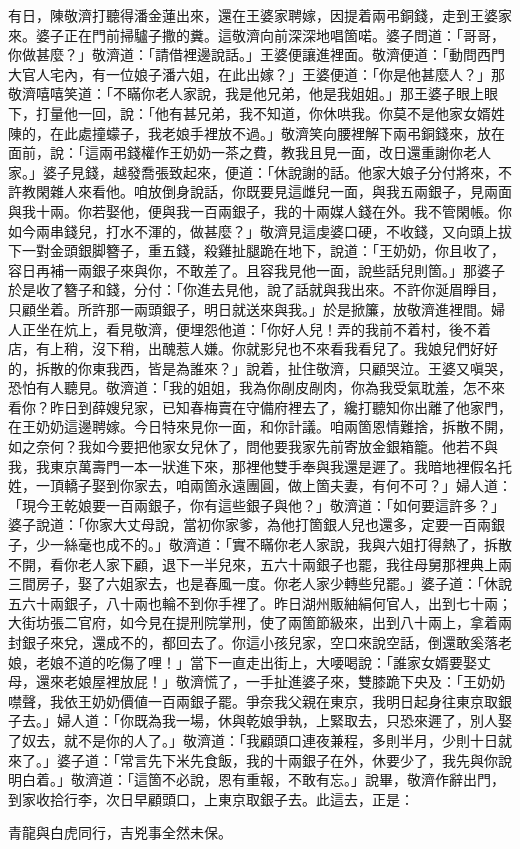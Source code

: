 有日，陳敬濟打聽得潘金蓮出來，還在王婆家聘嫁，因提着兩弔銅錢，走到王婆家來。婆子正在門前掃驢子撒的糞。這敬濟向前深深地唱箇喏。婆子問道：「哥哥，你做甚麼？」敬濟道：「請借裡邊說話。」王婆便讓進裡面。敬濟便道：「動問西門大官人宅內，有一位娘子潘六姐，在此出嫁？」王婆便道：「你是他甚麼人？」那敬濟嘻嘻笑道：「不瞞你老人家說，我是他兄弟，他是我姐姐。」那王婆子眼上眼下，打量他一回，說：「他有甚兄弟，我不知道，你休哄我。你莫不是他家女婿姓陳的，在此處撞蠓子，{}我老娘手裡放不過。」敬濟笑向腰裡解下兩弔銅錢來，放在面前，說：「這兩弔錢權作王奶奶一茶之費，教我且見一面，改日還重謝你老人家。」婆子見錢，越發喬張致起來，便道：「休說謝的話。他家大娘子分付將來，不許教閑雜人來看他。咱放倒身說話，你既要見這雌兒一面，與我五兩銀子，見兩面與我十兩。你若娶他，便與我一百兩銀子，我的十兩媒人錢在外。{}我不管閑帳。你如今兩串錢兒，打水不渾的，做甚麼？」敬濟見這虔婆口硬，不收錢，又向頭上拔下一對金頭銀脚簪子，重五錢，殺雞扯腿跪在地下，說道：「王奶奶，你且收了，容日再補一兩銀子來與你，不敢差了。且容我見他一面，說些話兒則箇。」那婆子於是收了簪子和錢，分付：「你進去見他，說了話就與我出來。不許你涎眉睜目，只顧坐着。{}所許那一兩頭銀子，明日就送來與我。」於是掀簾，放敬濟進裡間。婦人正坐在炕上，看見敬濟，便埋怨他道：「你好人兒！弄的我前不着村，後不着店，有上稍，沒下稍，出醜惹人嫌。你就影兒也不來看我看兒了。我娘兒們好好的，拆散的你東我西，皆是為誰來？」說着，扯住敬濟，只顧哭泣。王婆又嗔哭，恐怕有人聽見。敬濟道：「我的姐姐，我為你剮皮剮肉，你為我受氣耽羞，怎不來看你？昨日到薛嫂兒家，已知春梅賣在守備府裡去了，纔打聽知你出離了他家門，在王奶奶這邊聘嫁。今日特來見你一面，和你計議。咱兩箇恩情難捨，拆散不開，如之奈何？我如今要把他家女兒休了，問他要我家先前寄放金銀箱籠。他若不與我，我東京萬壽門一本一狀進下來，那裡他雙手奉與我還是遲了。我暗地裡假名托姓，一頂轎子娶到你家去，咱兩箇永遠團圓，做上箇夫妻，有何不可？」婦人道：「現今王乾娘要一百兩銀子，你有這些銀子與他？」敬濟道：「如何要這許多？」婆子說道：「你家大丈母說，當初你家爹，為他打箇銀人兒也還多，定要一百兩銀子，少一絲毫也成不的。」敬濟道：「實不瞞你老人家說，我與六姐打得熱了，拆散不開，看你老人家下顧，退下一半兒來，五六十兩銀子也罷，我往母舅那裡典上兩三間房子，娶了六姐家去，也是春風一度。你老人家少轉些兒罷。」婆子道：「休說五六十兩銀子，八十兩也輪不到你手裡了。昨日湖州販紬絹何官人，{}出到七十兩；大街坊張二官府，如今見在提刑院掌刑，使了兩箇節級來，出到八十兩上，拿着兩封銀子來兌，還成不的，都回去了。你這小孩兒家，空口來說空話，倒還敢奚落老娘，老娘不道的吃傷了哩！」當下一直走出街上，大喓喝說：「誰家女婿要娶丈母，還來老娘屋裡放屁！」{}敬濟慌了，一手扯進婆子來，雙膝跪下央及：「王奶奶噤聲，我依王奶奶價値一百兩銀子罷。爭奈我父親在東京，我明日起身往東京取銀子去。」婦人道：「你既為我一場，休與乾娘爭執，上緊取去，只恐來遲了，別人娶了奴去，就不是你的人了。」敬濟道：「我顧頭口連夜兼程，多則半月，少則十日就來了。」婆子道：「常言先下米先食飯，我的十兩銀子在外，休要少了，{}我先與你說明白着。」敬濟道：「這箇不必說，恩有重報，不敢有忘。」說畢，敬濟作辭出門，到家收拾行李，次日早顧頭口，上東京取銀子去。此這去，正是：

\begin{myquote}
青龍與白虎同行，吉兇事全然未保。
\end{myquote}

